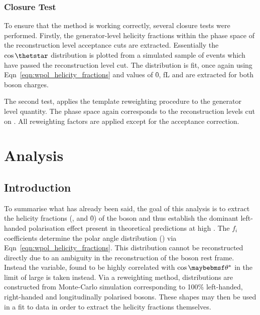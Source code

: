 \begin{figure}
\centering
{}\quad
{}\quad
\caption{}
\label{fig:wpol_genreco}
\end{figure}

\subsubsection{Closure Test}
To ensure that the method is working correctly, several closure tests were
performed. Firstly, the generator-level helicity fractions within the phase
space of the reconstruction level \PW acceptance cuts are extracted. Essentially
the $\cos\thetstar$ distribution is plotted from a simulated sample of events
which have passed the reconstruction level \PtW cut. The distribution is fit,
once again using Eqn~\ref{eqn:wpol_helicity_fractions} and values of \f0, fL and
\fR are extracted for both boson charges.

The second test, applies the template reweighting procedure to the generator
level \LP quantity. The phase space again corresponds to the reconstruction
levels cut on \PtW. All reweighting factors are applied except for the
acceptance correction.

\section{Analysis}
\subsection{Introduction}
To summarise what has already been said, the goal of this analysis is to extract
the helicity fractions (\fL, \fR and \f0) of the \PW boson and thus establish
the dominant left-handed polarisation effect present in theoretical predictions
at high \PtW. The $f_i$ coefficients determine the polar angle distribution
(\thetastar) via Eqn~\ref{eqn:wpol_helicity_fractions}. This distribution cannot
be reconstructed directly due to an ambiguity in the reconstruction of the \PW
boson rest frame. Instead the \LP variable, found to be highly correlated with
$\cos\thetastar$ in the limit of large \PtW is taken instead. Via a reweighting
method, \LP distributions are constructed from Monte-Carlo simulation
corresponding to 100\% left-handed, right-handed and longitudinally polarised
\PW bosons. These shapes may then be used in a fit to data in order to extract
the helicity fractions themselves.

